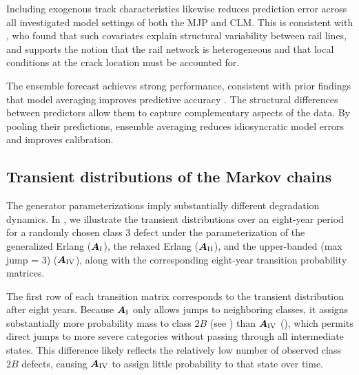 Including exogenous track characteristics likewise reduces prediction error across all investigated model settings of both the MJP and CLM. This is consistent with \citet{bisgaard2024A}, who found that such covariates explain structural variability between rail lines, and supports the notion that the rail network is heterogeneous and that local conditions at the crack location must be accounted for.

The ensemble forecast achieves strong performance, consistent with prior findings that model averaging improves predictive accuracy \citep{wu2021a}. The structural differences between predictors allow them to capture complementary aspects of the data. By pooling their predictions, ensemble averaging reduces idiosyncratic model errors and improves calibration.
 


\FloatBarrier
 
 
 

\subsection{Transient distributions of the Markov chains} \label{sec:results_transient_dist_markov}
The generator parameterizations imply substantially different degradation dynamics.
In , %
we illustrate the transient distributions over an eight-year period for a randomly chosen class $3$ defect
under the parameterization of the generalized Erlang ($\bm{A}_{\RN{1}}$), the relaxed Erlang ($\bm{A}_{\RN{2}}$), and the upper-banded (max jump = 3) ($\bm{A}_{\RN{4}}$), 
along with the corresponding eight-year transition probability matrices.


The first row of each transition matrix corresponds to the transient distribution after eight years.
Because $\bm{A}_{\RN{1}}$ only allows jumps to neighboring classes, it assigns substantially more probability mass to class $2B$ (see ) than $\bm{A}_{\RN{4}}$ (), which permits direct jumps to more severe categories without passing through all intermediate states.
This difference likely reflects the relatively low number of observed class $2B$ defects, causing $\bm{A}_{\RN{4}}$ to assign little probability to that state over time.

